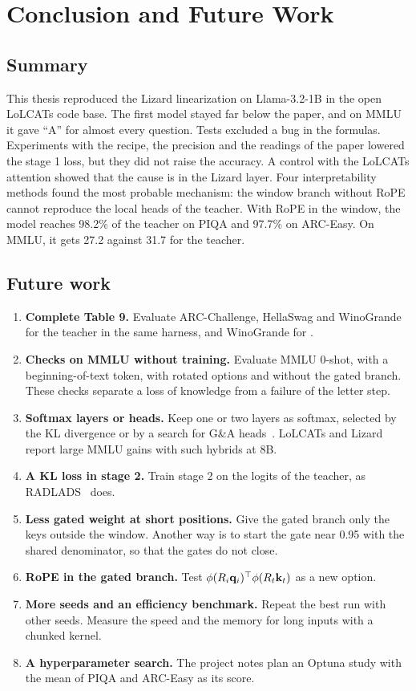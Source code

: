 \chapter{Conclusion and Future Work}
\label{ch:conclusion}

\section{Summary}
\label{sec:summary}

This thesis reproduced the Lizard linearization on Llama-3.2-1B in the open LoLCATs code base. The first model stayed far below the paper, and on MMLU it gave \enquote{A} for almost every question. Tests excluded a bug in the formulas. Experiments with the recipe, the precision and the readings of the paper lowered the stage 1 loss, but they did not raise the accuracy. A control with the LoLCATs attention showed that the cause is in the Lizard layer. Four interpretability methods found the most probable mechanism: the window branch without RoPE cannot reproduce the local heads of the teacher. With RoPE in the window, the model reaches 98.2\% of the teacher on PIQA and 97.7\% on ARC-Easy. On MMLU, it gets 27.2 against 31.7 for the teacher.

\section{Future work}
\label{sec:future}

\begin{enumerate}
\item \textbf{Complete Table 9.} Evaluate ARC-Challenge, HellaSwag and WinoGrande for the teacher in the same harness, and WinoGrande for .
\item \textbf{Checks on MMLU without training.} Evaluate MMLU 0-shot, with a beginning-of-text token, with rotated options and without the gated branch. These checks separate a loss of knowledge from a failure of the letter step.
\item \textbf{Softmax layers or heads.} Keep one or two layers as softmax, selected by the KL divergence or by a search for G\&A heads~\cite{bick2025,klselect}. LoLCATs and Lizard report large MMLU gains with such hybrids at 8B.
\item \textbf{A KL loss in stage 2.} Train stage 2 on the logits of the teacher, as RADLADS~\cite{radlads} does.
\item \textbf{Less gated weight at short positions.} Give the gated branch only the keys outside the window. Another way is to start the gate near 0.95 with the shared denominator, so that the gates do not close.
\item \textbf{RoPE in the gated branch.} Test $\phi(R_i\mathbf{q}_i)^\top\phi(R_t\mathbf{k}_t)$ as a new option.
\item \textbf{More seeds and an efficiency benchmark.} Repeat the best run with other seeds. Measure the speed and the memory for long inputs with a chunked kernel.
\item \textbf{A hyperparameter search.} The project notes plan an Optuna study with the mean of PIQA and ARC-Easy as its score.
\end{enumerate}
